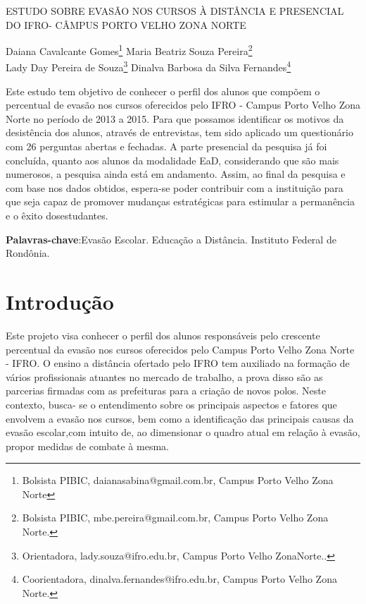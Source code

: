 \documentclass[article,12pt,onesidea,4paper,english,brazil]{abntex2}
\begin{document}
	
	
	\frenchspacing 
	
	\begin{center}
		\LARGE ESTUDO SOBRE EVASÃO NOS CURSOS À DISTÂNCIA E PRESENCIAL DO IFRO- CÂMPUS PORTO VELHO ZONA NORTE
		
		\normalsize
		Daiana Cavalcante Gomes\footnote{Bolsista PIBIC, daianasabina@gmail.com.br, Campus Porto Velho Zona Norte} 
		Maria Beatriz Souza Pereira\footnote{Bolsista PIBIC, mbe.pereira@gmail.com.br, Campus Porto Velho Zona Norte.} \\
		Lady Day Pereira de Souza\footnote{Orientadora, lady.souza@ifro.edu.br, Campus Porto Velho ZonaNorte..} 
	Dinalva Barbosa da Silva Fernandes\footnote{Coorientadora, dinalva.fernandes@ifro.edu.br, Campus Porto Velho Zona Norte.} 
	\end{center}
	
	\begin{resumoumacoluna}
	Este estudo tem objetivo de conhecer o perfil dos alunos que compõem o percentual de evasão nos cursos oferecidos pelo IFRO - Campus Porto Velho Zona Norte no período de 2013 a 2015. Para que possamos identificar os motivos da desistência dos alunos, através de entrevistas, tem sido aplicado um questionário com 26 perguntas abertas e fechadas. A parte presencial da pesquisa já foi concluída, quanto aos alunos da modalidade EaD, considerando que são mais numerosos, a pesquisa ainda está em andamento. Assim, ao final da pesquisa e com base nos dados obtidos, espera-se poder contribuir com a instituição para que seja capaz de promover mudanças estratégicas para estimular a permanência e o êxito dosestudantes.
	
	
		
		\vspace{\onelineskip}
		
		\noindent
		\textbf{Palavras-chave}:Evasão Escolar. Educação a Distância. Instituto Federal de Rondônia.
	\end{resumoumacoluna}
	
	\section*{Introdução}
	
	Este projeto visa conhecer o perfil dos alunos responsáveis pelo crescente percentual da evasão nos cursos oferecidos pelo Campus Porto Velho Zona Norte - IFRO. O ensino a distância ofertado pelo IFRO tem auxiliado na formação de vários profissionais atuantes no mercado de trabalho, a prova disso são as parcerias firmadas com as prefeituras para a criação de novos polos. Neste contexto, busca- se o entendimento sobre os principais aspectos e fatores que envolvem a evasão nos cursos, bem como a identificação das principais causas da evasão escolar,com intuito de, ao dimensionar o quadro atual em relação à evasão, propor medidas de combate à mesma.
	
\end{document}
